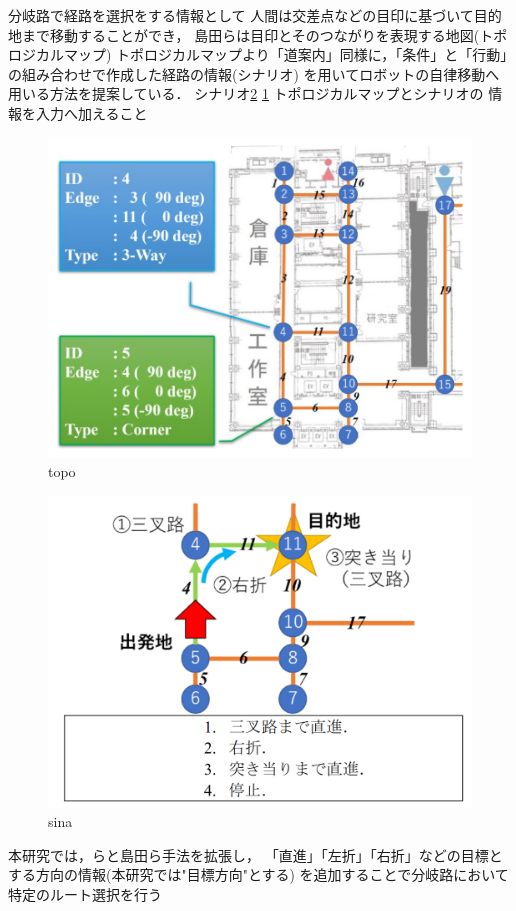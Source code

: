 分岐路で経路を選択をする情報として
人間は交差点などの目印に基づいて目的地まで移動することができ，
島田らは目印とそのつながりを表現する地図(トポロジカルマップ)
トポロジカルマップより「道案内」同様に，「条件」と「行動」の組み合わせで作成した経路の情報(シナリオ)
を用いてロボットの自律移動へ用いる方法を提案している．
シナリオ\ref{fig::sina}
\ref{fig::topo}
トポロジカルマップとシナリオの
情報を入力へ加えること
\begin{figure}[H]
    \centering
    \includegraphics[width = 12cm]{./figs/topo.png}
    \caption{topo\cite{razikon}}
    \label{fig::topo}
\end{figure}
\begin{figure}[H]
    \centering
    \includegraphics[width = 12cm]{./figs/sina.png}
    \caption{sina\cite{razikon}}
    \label{fig::sina}
\end{figure}
本研究では，\cite{okada}らと島田ら手法を拡張し，
「直進」「左折」「右折」などの目標とする方向の情報(本研究では"目標方向"とする)
を追加することで分岐路において特定のルート選択を行う


